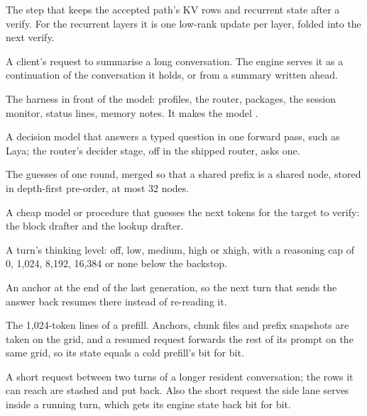 \begin{description}[style=unboxed, leftmargin=0pt, itemsep=.5ex, font=\normalfont\bfseries]
\item[commit] The step that keeps the accepted path's KV rows and recurrent state after a verify. For the recurrent layers it is one low-rank update per layer, folded into the next verify.

\item[compaction] A client's request to summarise a long conversation. The engine serves it as a continuation of the conversation it holds, or from a summary written ahead.

\item[conductor] The harness in front of the model: profiles, the router, packages, the session monitor, status lines, memory notes. It makes the model .

\item[decider] A decision model that answers a typed question in one forward pass, such as Laya; the router's decider stage, off in the shipped router, asks one.

\item[draft tree] The guesses of one round, merged so that a shared prefix is a shared node, stored in depth-first pre-order, at most 32 nodes.

\item[drafter] A cheap model or procedure that guesses the next tokens for the target to verify: the block drafter and the lookup drafter.

\item[effort] A turn's thinking level: off, low, medium, high or xhigh, with a reasoning cap of 0, 1,024, 8,192, 16,384 or none below the backstop.

\item[end anchor] An anchor at the end of the last generation, so the next turn that sends the answer back resumes there instead of re-reading it.

\item[grid] The 1,024-token lines of a prefill. Anchors, chunk files and prefix snapshots are taken on the grid, and a resumed request forwards the rest of its prompt on the same grid, so its state equals a cold prefill's bit for bit.

\item[guest] A short request between two turns of a longer resident conversation; the rows it can reach are stashed and put back. Also the short request the side lane serves inside a running turn, which gets its engine state back bit for bit.


\end{description}
